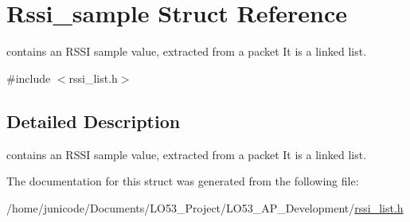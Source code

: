 \hypertarget{struct_rssi__sample}{}\section{Rssi\+\_\+sample Struct Reference}
\label{struct_rssi__sample}


contains an R\+S\+S\+I sample value, extracted from a packet It is a linked list.  




{\ttfamily \#include $<$rssi\+\_\+list.\+h$>$}



\subsection{Detailed Description}
contains an R\+S\+S\+I sample value, extracted from a packet It is a linked list. 

The documentation for this struct was generated from the following file\+:\begin{DoxyCompactItemize}
\item 
/home/junicode/\+Documents/\+L\+O53\+\_\+\+Project/\+L\+O53\+\_\+\+A\+P\+\_\+\+Development/\hyperlink{rssi__list_8h}{rssi\+\_\+list.\+h}\end{DoxyCompactItemize}
